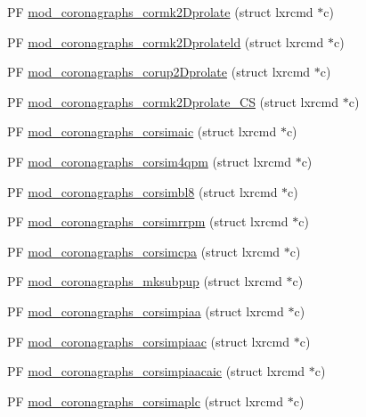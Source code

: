 \begin{DoxyCompactItemize}
\item 
P\+F \hyperlink{coronagraphs-util_8c_a4a8c6bc3b436950d57c8edff7d08c8b1}{mod\+\_\+coronagraphs\+\_\+cormk2\+Dprolate} (struct lxrcmd $\ast$c)
\item 
P\+F \hyperlink{coronagraphs-util_8c_a0e2a39ce8179e984872fc28ed424a83e}{mod\+\_\+coronagraphs\+\_\+cormk2\+Dprolateld} (struct lxrcmd $\ast$c)
\item 
P\+F \hyperlink{coronagraphs-util_8c_a949c485b2474e41f248a17478008a164}{mod\+\_\+coronagraphs\+\_\+corup2\+Dprolate} (struct lxrcmd $\ast$c)
\item 
P\+F \hyperlink{coronagraphs-util_8c_aa5a2f9ae091e94fad26d42f8d55467d3}{mod\+\_\+coronagraphs\+\_\+cormk2\+Dprolate\+\_\+\+C\+S} (struct lxrcmd $\ast$c)
\item 
P\+F \hyperlink{coronagraphs-util_8c_a9fa4dfe8c15d371ec5f9ab96589e350b}{mod\+\_\+coronagraphs\+\_\+corsimaic} (struct lxrcmd $\ast$c)
\item 
P\+F \hyperlink{coronagraphs-util_8c_aa1e124dd3e89153a39139d1bc5f48a6c}{mod\+\_\+coronagraphs\+\_\+corsim4qpm} (struct lxrcmd $\ast$c)
\item 
P\+F \hyperlink{coronagraphs-util_8c_a3ea43d8fb405d63839784ce312d88f53}{mod\+\_\+coronagraphs\+\_\+corsimbl8} (struct lxrcmd $\ast$c)
\item 
P\+F \hyperlink{coronagraphs-util_8c_a02e9ac984e27521eaf1054d546ca9d8e}{mod\+\_\+coronagraphs\+\_\+corsimrrpm} (struct lxrcmd $\ast$c)
\item 
P\+F \hyperlink{coronagraphs-util_8c_af6fc8c21c4930344b7d4fd71b5ab062b}{mod\+\_\+coronagraphs\+\_\+corsimcpa} (struct lxrcmd $\ast$c)
\item 
P\+F \hyperlink{coronagraphs-util_8c_afdac82ed1f2f851d2601fc33afe9bbad}{mod\+\_\+coronagraphs\+\_\+mksubpup} (struct lxrcmd $\ast$c)
\item 
P\+F \hyperlink{coronagraphs-util_8c_ac5101e2ead368ac863546684da4310fe}{mod\+\_\+coronagraphs\+\_\+corsimpiaa} (struct lxrcmd $\ast$c)
\item 
P\+F \hyperlink{coronagraphs-util_8c_a103ebd989fc710ee5078cbad55f80122}{mod\+\_\+coronagraphs\+\_\+corsimpiaac} (struct lxrcmd $\ast$c)
\item 
P\+F \hyperlink{coronagraphs-util_8c_ae1bae2c1d62a3c1db1536f8d34cfc35f}{mod\+\_\+coronagraphs\+\_\+corsimpiaacaic} (struct lxrcmd $\ast$c)
\item 
P\+F \hyperlink{coronagraphs-util_8c_a1899341d9678aeef845c3e6b93a19665}{mod\+\_\+coronagraphs\+\_\+corsimaplc} (struct lxrcmd $\ast$c)

\end{DoxyCompactItemize}
